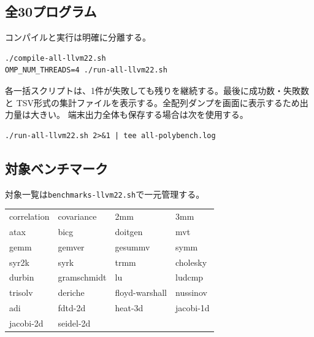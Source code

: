 \documentclass[a4paper,11pt]{ltjsarticle}
\begin{document}
\subsection{全30プログラム}
コンパイルと実行は明確に分離する。
\begin{lstlisting}
./compile-all-llvm22.sh
OMP_NUM_THREADS=4 ./run-all-llvm22.sh
\end{lstlisting}

各一括スクリプトは、1件が失敗しても残りを継続する。最後に成功数・失敗数と
TSV形式の集計ファイルを表示する。全配列ダンプを画面に表示するため出力量は大きい。
端末出力全体も保存する場合は次を使用する。
\begin{lstlisting}
./run-all-llvm22.sh 2>&1 | tee all-polybench.log
\end{lstlisting}

\subsection{対象ベンチマーク}
対象一覧は\texttt{benchmarks-llvm22.sh}で一元管理する。

\small
\begin{longtable}{llll}
correlation & covariance & 2mm & 3mm \\
atax & bicg & doitgen & mvt \\
gemm & gemver & gesummv & symm \\
syr2k & syrk & trmm & cholesky \\
durbin & gramschmidt & lu & ludcmp \\
trisolv & deriche & floyd-warshall & nussinov \\
adi & fdtd-2d & heat-3d & jacobi-1d \\
jacobi-2d & seidel-2d & & \\
\end{longtable}
\normalsize
\end{document}
